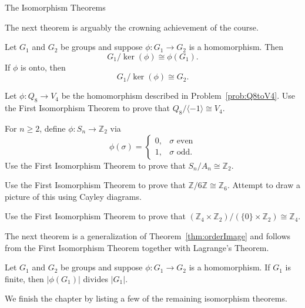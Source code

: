 \begin{section}{The Isomorphism Theorems}

The next theorem is arguably the crowning achievement of the course.

\begin{theorem}
Let $G_1$ and $G_2$ be groups and suppose $\phi:G_1\to G_2$ is a homomorphism. Then
\[
G_1/\ker(\phi)\cong \phi(G_1).
\]
If $\phi$ is onto, then
\[
G_1/\ker(\phi)\cong G_2.
\]
\end{theorem}

\begin{problem}
Let $\phi:Q_8\to V_4$ be the homomorphism described in Problem~\ref{prob:Q8toV4}. Use the First Isomorphism Theorem to prove that $Q_8/\langle-1\rangle\cong V_4$.
\end{problem}

\begin{problem}
For $n\geq 2$, define $\phi:S_n\to \mathbb{Z}_2$ via
\[
\phi(\sigma)=\begin{cases}
0, & \sigma \text{ even}\\
1, & \sigma \text{ odd}.
\end{cases}
\]
Use the First Isomorphism Theorem to prove that $S_n/A_n\cong \mathbb{Z}_2$.
\end{problem}

\begin{problem}
Use the First Isomorphism Theorem to prove that $\mathbb{Z}/6\mathbb{Z}\cong \mathbb{Z}_6$.  Attempt to draw a picture of this using Cayley diagrams.
\end{problem}

\begin{problem}
Use the First Isomorphism Theorem to prove that $(\mathbb{Z}_4\times \mathbb{Z}_2)/(\{0\}\times \mathbb{Z}_2)\cong \mathbb{Z}_4$.
\end{problem}

The next theorem is a generalization of Theorem~\ref{thm:orderImage} and follows from the First Isomorphism Theorem together with Lagrange's Theorem.

\begin{theorem}
Let $G_1$ and $G_2$ be groups and suppose $\phi:G_1\to G_2$ is a homomorphism. If $G_1$ is finite, then $|\phi(G_1)|$ divides $|G_1|$.
\end{theorem}

We finish the chapter by listing a few of the remaining isomorphism theorems.%


\end{section}
